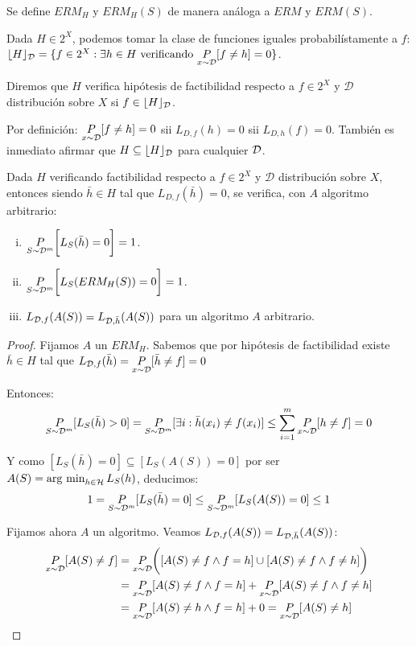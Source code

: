 Se define $ERM_H$ y $ERM_H(S)$ de manera análoga a $ERM$ y $ERM(S)$.

Dada $H\in 2^X$, podemos tomar la clase de funciones iguales probabilístamente a $f$:
$\lfloor H \rfloor_{\mathcal{D}} = \{f\in 2^X: \exists h\in H \textrm{ verificando }\underset{x\sim \mathcal{D}}{P}[f\neq h] = 0\}$.

\begin{definition}

Diremos que $H$ verifica hipótesis de factibilidad respecto a $f\in 2^X$ y $\mathcal{D}$ distribución sobre 
$X$ si $f\in \lfloor H \rfloor_{\mathcal{D}}$. 
\end{definition}

Por definición: $\underset{x\sim \mathcal{D}}{P}[f\neq h]=0$ sii $L_{D,f}(h) = 0$ sii $L_{D,h}(f) = 0$. También es inmediato afirmar que
$H \subseteq \lfloor H \rfloor_{\mathcal{D}}$ para cualquier $\mathcal{D}$.

\begin{fact}
Dada $H$ verificando factibilidad respecto a $f\in 2^X$ y $\mathcal{D}$ distribución sobre $X$, entonces siendo 
${\bar{h}} \in H$ tal que $L_{D,f}(\bar{h}) = 0$, se verifica, con $A$ algoritmo arbitrario:
\begin{enumerate}[i.]
\item $\underset{S\sim \mathcal{D}^m}{P} \bigg[L_S(\bar{h}) = 0 \bigg] = 1$.
\item $\underset{S\sim \mathcal{D}^m}{P} \bigg[L_S(ERM_H(S)) = 0 \bigg] = 1$.
\item $L_{\mathcal{D},f}(A(S)) = L_{\mathcal{D},\bar{h}}(A(S))$ para un algoritmo $A$ arbitrario.
\end{enumerate}
\label{fact:factibilidad}
\end{fact}

\begin{proof}
Fijamos $A$ un $ERM_H$. Sabemos que por hipótesis de factibilidad existe $\bar{h} \in H$ tal que
$L_{\mathcal{D},f}(\bar{h}) = \underset{x\sim \mathcal{D}}{P}[\bar{h}\neq f] = 0$

Entonces: 
\[
  \underset{S\sim \mathcal{D}^m}{P}[L_S(\bar{h}) > 0] = \underset{S\sim \mathcal{D}^m}{P}
  [\exists i: \bar{h}(x_i) \neq f(x_i)] \le \sum_{i=1}^m \underset{x\sim \mathcal{D}}{P}[h\neq f] = 0
\]

Y como $[L_S(\bar{h}) = 0] \subseteq [L_S(A(S)) = 0]$ por ser $A(S) = \operatorname*{arg\,\min}_{h\in \mathcal{H}} L_S(h)$, deducimos:
\[
  1 = \underset{S\sim \mathcal{D}^m}{P}[L_S(\bar{h}) = 0] \le \underset{S\sim \mathcal{D}^m}{P}[L_S(A(S)) = 0] \le 1
\]

Fijamos ahora $A$ un algoritmo. Veamos $L_{\mathcal{D},f}(A(S)) = L_{\mathcal{D},\bar{h}}(A(S))$:
  \begin{align*}
  \underset{x\sim \mathcal{D}}{P}[A(S) \neq f] &= \underset{x\sim \mathcal{D}}{P}\bigg([A(S) \neq f \wedge f=h] \cup[A(S) \neq f \wedge f\neq h]\bigg)\\
  &= \underset{x\sim \mathcal{D}}{P}[A(S) \neq f \wedge f=h] + \underset{x\sim \mathcal{D}}{P}[A(S) \neq f \wedge f\neq h]\\
  &= \underset{x\sim \mathcal{D}}{P}[A(S) \neq h \wedge f=h] + 0 = \underset{x\sim \mathcal{D}}{P}[A(S)\neq h]
  \end{align*}
\end{proof}

